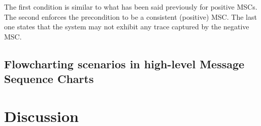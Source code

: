 The first condition is similar to what has been said previously for positive MSCs. The second enforces the precondition to be a consistent (positive) MSC. The last one states that the system may not exhibit any trace captured by the negative MSC.

\subsection[Flowcharting scenarios in high-level MSCs]{Flowcharting scenarios in high-level Message Sequence Charts}

\section{Discussion\label{section:background-discussion}}
